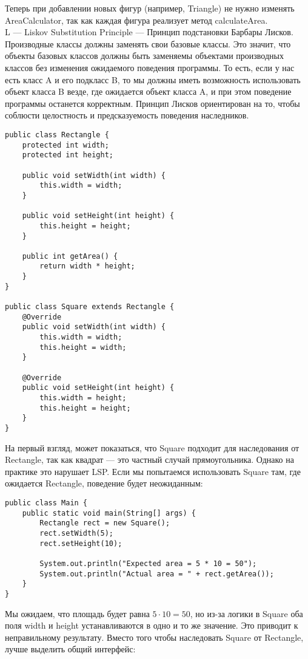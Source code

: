 Теперь при добавлении новых фигур (например, Triangle) не нужно изменять AreaCalculator, так как каждая фигура реализует метод calculateArea. \\
\noindent L — Liskov Substitution Principle — Принцип подстановки Барбары Лисков. Производные классы должны заменять свои базовые классы. Это значит, что объекты базовых классов должны быть заменяемы объектами производных классов без изменения ожидаемого поведения программы. То есть, если у нас есть класс A и его подкласс B, то мы должны иметь возможность использовать объект класса B везде, где ожидается объект класса A, и при этом поведение программы останется корректным. Принцип Лисков ориентирован на то, чтобы соблюсти целостность и предсказуемость поведения наследников. \\
\begin{lstlisting}
public class Rectangle {
    protected int width;
    protected int height;

    public void setWidth(int width) {
        this.width = width;
    }

    public void setHeight(int height) {
        this.height = height;
    }

    public int getArea() {
        return width * height;
    }
}

public class Square extends Rectangle {
    @Override
    public void setWidth(int width) {
        this.width = width;
        this.height = width;
    }

    @Override
    public void setHeight(int height) {
        this.width = height;
        this.height = height;
    }
}
\end{lstlisting}
На первый взгляд, может показаться, что Square подходит для наследования от Rectangle, так как квадрат — это частный случай прямоугольника. Однако на практике это нарушает LSP. Если мы попытаемся использовать Square там, где ожидается Rectangle, поведение будет неожиданным:
\begin{lstlisting}
public class Main {
    public static void main(String[] args) {
        Rectangle rect = new Square();
        rect.setWidth(5);
        rect.setHeight(10);

        System.out.println("Expected area = 5 * 10 = 50");
        System.out.println("Actual area = " + rect.getArea());
    }
}
\end{lstlisting}
Мы ожидаем, что площадь будет равна $5 \cdot 10 = 50$, но из-за логики в Square оба поля width и height устанавливаются в одно и то же значение. Это приводит к неправильному результату. Вместо того чтобы наследовать Square от Rectangle, лучше выделить общий интерфейс: 
